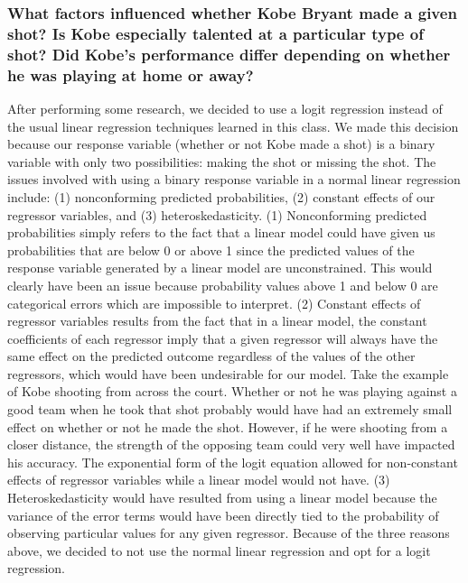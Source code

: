 \documentclass[paper=a4, fontsize=11pt]{scrartcl} %
\numberwithin{equation}{section} %
\numberwithin{figure}{section} %
\numberwithin{table}{section} %
\begin{document}
\subsubsection{What factors influenced whether Kobe Bryant made a given shot? Is Kobe especially talented at a particular type of shot? Did Kobe's performance differ depending on whether he was playing at home or away?
}
\hspace*{1cm}After performing some research, we decided to use a logit regression instead of the usual linear regression techniques learned in this class. We made this decision because our response variable (whether or not Kobe made a shot) is a binary variable with only two possibilities: making the shot or missing the shot. The issues involved with using a binary response variable in a normal linear regression include: (1) nonconforming predicted probabilities, (2) constant effects of our regressor variables, and (3) heteroskedasticity. (1) Nonconforming predicted probabilities simply refers to the fact that a linear model could have given us probabilities that are below 0 or above 1 since the predicted values of the response variable generated by a linear model are unconstrained. This would clearly have been an issue because probability values above 1 and below 0 are categorical errors which are impossible to interpret. (2) Constant effects of regressor variables results from the fact that in a linear model, the constant coefficients of each regressor imply that a given regressor will always have the same effect on the predicted outcome regardless of the values of the other regressors, which would have been undesirable for our model. Take the example of Kobe shooting from across the court. Whether or not he was playing against a good team when he took that shot probably would have had an extremely small effect on whether or not he made the shot. However, if he were shooting from a closer distance, the strength of the opposing team could very well have impacted his accuracy. The exponential form of the logit equation allowed for non-constant effects of regressor variables while a linear model would not have. (3) Heteroskedasticity would have resulted from using a linear model because the variance of the error terms would have been directly tied to the probability of observing particular values for any given regressor. Because of the three reasons above, we decided to not use the normal linear regression and opt for a logit regression. 
\end{document}
